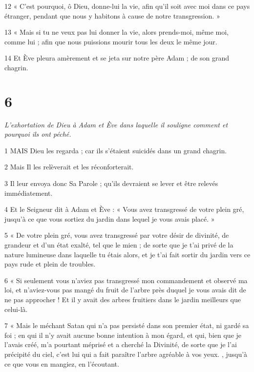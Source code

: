 \par 12 « C'est pourquoi, ô Dieu, donne-lui la vie, afin qu'il soit avec moi dans ce pays étranger, pendant que nous y habitons à cause de notre transgression. »

\par 13 « Mais si tu ne veux pas lui donner la vie, alors prends-moi, même moi, comme lui ; afin que nous puissions mourir tous les deux le même jour.

\par 14 Et Ève pleura amèrement et se jeta sur notre père Adam ; de son grand chagrin.

\chapter{6}

\par \textit{L'exhortation de Dieu à Adam et Ève dans laquelle il souligne comment et pourquoi ils ont péché.}

\par 1 MAIS Dieu les regarda ; car ils s'étaient suicidés dans un grand chagrin.

\par 2 Mais Il les relèverait et les réconforterait.

\par 3 Il leur envoya donc Sa Parole ; qu'ils devraient se lever et être relevés immédiatement.

\par 4 Et le Seigneur dit à Adam et Ève : « Vous avez transgressé de votre plein gré, jusqu'à ce que vous sortiez du jardin dans lequel je vous avais placé. »

\par 5 « De votre plein gré, vous avez transgressé par votre désir de divinité, de grandeur et d'un état exalté, tel que le mien ; de sorte que je t'ai privé de la nature lumineuse dans laquelle tu étais alors, et je t'ai fait sortir du jardin vers ce pays rude et plein de troubles.

\par 6 « Si seulement vous n'aviez pas transgressé mon commandement et observé ma loi, et n'aviez-vous pas mangé du fruit de l'arbre près duquel je vous avais dit de ne pas approcher ! Et il y avait des arbres fruitiers dans le jardin meilleurs que celui-là.

\par 7 « Mais le méchant Satan qui n'a pas persisté dans son premier état, ni gardé sa foi ; en qui il n'y avait aucune bonne intention à mon égard, et qui, bien que je l'avais créé, m'a pourtant méprisé et a cherché la Divinité, de sorte que je l'ai précipité du ciel, c'est lui qui a fait paraître l'arbre agréable à vos yeux. , jusqu'à ce que vous en mangiez, en l'écoutant.

